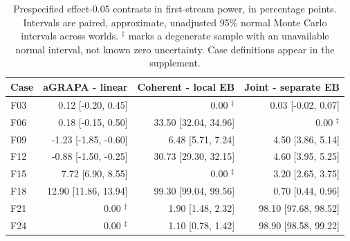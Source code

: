 \begin{table}[tb]\centering
\begingroup\small\setlength{\tabcolsep}{3pt}
\begin{tabular}{lrrr}\toprule
Case & aGRAPA - linear & Coherent - local EB & Joint - separate EB\\\midrule
F03 & 0.12 [-0.20, 0.45] & 0.00 $^{\ddagger}$ & 0.03 [-0.02, 0.07]\\
F06 & 0.18 [-0.15, 0.50] & 33.50 [32.04, 34.96] & 0.00 $^{\ddagger}$\\
F09 & -1.23 [-1.85, -0.60] & 6.48 [5.71, 7.24] & 4.50 [3.86, 5.14]\\
F12 & -0.88 [-1.50, -0.25] & 30.73 [29.30, 32.15] & 4.60 [3.95, 5.25]\\
F15 & 7.72 [6.90, 8.55] & 0.00 $^{\ddagger}$ & 3.20 [2.65, 3.75]\\
F18 & 12.90 [11.86, 13.94] & 99.30 [99.04, 99.56] & 0.70 [0.44, 0.96]\\
F21 & 0.00 $^{\ddagger}$ & 1.90 [1.48, 2.32] & 98.10 [97.68, 98.52]\\
F24 & 0.00 $^{\ddagger}$ & 1.10 [0.78, 1.42] & 98.90 [98.58, 99.22]\\
\bottomrule\end{tabular}
\endgroup
\caption{Prespecified effect-0.05 contrasts in first-stream power, in percentage points. Intervals are paired, approximate, unadjusted 95\% normal Monte Carlo intervals across worlds. $^{\ddagger}$ marks a degenerate sample with an unavailable normal interval, not known zero uncertainty. Case definitions appear in the supplement.}\label{tab:followup-paired}
\end{table}
